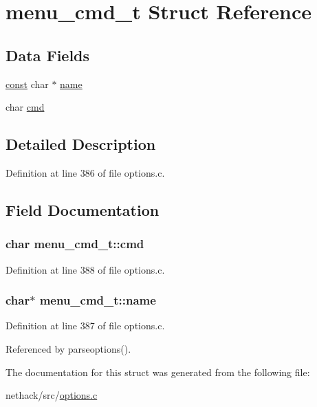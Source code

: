 \hypertarget{structmenu__cmd__t}{\section{menu\+\_\+cmd\+\_\+t Struct Reference}
\label{structmenu__cmd__t}
}
\subsection*{Data Fields}
\begin{DoxyCompactItemize}
\item 
\hyperlink{tradstdc_8h_a2c212835823e3c54a8ab6d95c652660e}{const} char $\ast$ \hyperlink{structmenu__cmd__t_aa8dbb13adc8db8a0ba5ae332346769e5}{name}
\item 
char \hyperlink{structmenu__cmd__t_a91fd7c2168799d7fd6fb4bd1d0d27602}{cmd}
\end{DoxyCompactItemize}


\subsection{Detailed Description}


Definition at line 386 of file options.\+c.



\subsection{Field Documentation}
\hypertarget{structmenu__cmd__t_a91fd7c2168799d7fd6fb4bd1d0d27602}{
\subsubsection[{cmd}]{\setlength{\rightskip}{0pt plus 5cm}char menu\+\_\+cmd\+\_\+t\+::cmd}}\label{structmenu__cmd__t_a91fd7c2168799d7fd6fb4bd1d0d27602}


Definition at line 388 of file options.\+c.

\hypertarget{structmenu__cmd__t_aa8dbb13adc8db8a0ba5ae332346769e5}{
\subsubsection[{name}]{ char$\ast$ menu\+\_\+cmd\+\_\+t\+::name}}\label{structmenu__cmd__t_aa8dbb13adc8db8a0ba5ae332346769e5}


Definition at line 387 of file options.\+c.



Referenced by parseoptions().



The documentation for this struct was generated from the following file\+:\begin{DoxyCompactItemize}
\item 
nethack/src/\hyperlink{options_8c}{options.\+c}\end{DoxyCompactItemize}
